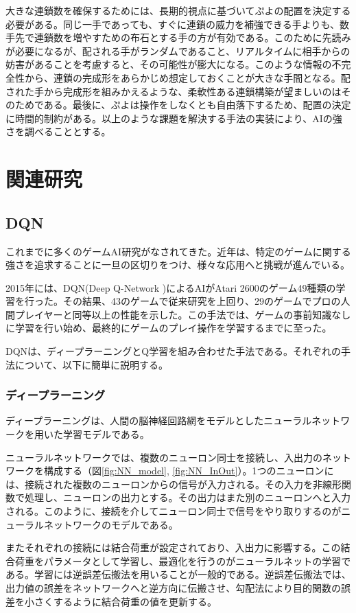 \documentclass[12pt]{jreport}
\begin{document}
大きな連鎖数を確保するためには、長期的視点に基づいてぷよの配置を決定する必要がある。同じ一手であっても、すぐに連鎖の威力を補強できる手よりも、数手先で連鎖数を増やすための布石とする手の方が有効である。このために先読みが必要になるが、配される手がランダムであること、リアルタイムに相手からの妨害があることを考慮すると、その可能性が膨大になる。このような情報の不完全性から、連鎖の完成形をあらかじめ想定しておくことが大きな手間となる。配された手から完成形を組みかえるような、柔軟性ある連鎖構築が望ましいのはそのためである。最後に、ぷよは操作をしなくとも自由落下するため、配置の決定に時間的制約がある。以上のような課題を解決する手法の実装により、AIの強さを調べることとする。

\chapter{関連研究} \label{research} \setcounter{section}{0}
\section{DQN}
これまでに多くのゲームAI研究がなされてきた。近年は、特定のゲームに関する強さを追求することに一旦の区切りをつけ、様々な応用へと挑戦が進んでいる\cite{yan_panorama, adaptive}。

2015年には、DQN(Deep Q-Network )によるAIがAtari 2600のゲーム49種類の学習を行った\cite{DQN}。その結果、43のゲームで従来研究を上回り、29のゲームでプロの人間プレイヤーと同等以上の性能を示した。この手法では、ゲームの事前知識なしに学習を行い始め、最終的にゲームのプレイ操作を学習するまでに至った。

DQNは、ディープラーニングとQ学習を組み合わせた手法である。それぞれの手法について、以下に簡単に説明する。

\subsection{ディープラーニング}
ディープラーニングは、人間の脳神経回路網をモデルとしたニューラルネットワークを用いた学習モデルである。

ニューラルネットワークでは、複数のニューロン同士を接続し、入出力のネットワークを構成する（図\ref{fig:NN_model}, \ref{fig:NN_InOut}）。1つのニューロンには、接続された複数のニューロンからの信号が入力される。その入力を非線形関数で処理し、ニューロンの出力とする。その出力はまた別のニューロンへと入力される。このように、接続を介してニューロン同士で信号をやり取りするのがニューラルネットワークのモデルである。

またそれぞれの接続には結合荷重が設定されており、入出力に影響する。この結合荷重をパラメータとして学習し、最適化を行うのがニューラルネットの学習である。学習には逆誤差伝搬法を用いることが一般的である。逆誤差伝搬法では、出力値の誤差をネットワークへと逆方向に伝搬させ、勾配法により目的関数の誤差を小さくするように結合荷重の値を更新する。
\end{document}
